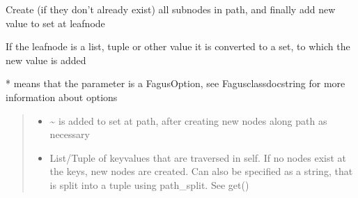 \documentclass[a4paper,10pt,english]{sphinxmanual}
\begin{document}
\begin{fulllineitems}
\begin{fulllineitems}
\label{\detokenize{fagus:fagus.Fagus.add}}
\pysigstartsignatures
{}
\pysigstopsignatures
\sphinxAtStartPar
Create (if they don’t already exist) all sub\sphinxhyphen{}nodes in path, and finally add new value to set at leaf\sphinxhyphen{}node

\sphinxAtStartPar
If the leaf\sphinxhyphen{}node is a list, tuple or other value it is converted to a set, to which the new value is added

\sphinxAtStartPar
* means that the parameter is a FagusOption, see Fagus\sphinxhyphen{}class\sphinxhyphen{}docstring for more information about options
\begin{quote}\begin{description}
\begin{itemize}
\item {}
\sphinxAtStartPar
{} \textendash{} \textasciitilde{} is added to set at path, after creating new nodes along path as necessary

\item {}
\sphinxAtStartPar
{} \textendash{} List/Tuple of key\sphinxhyphen{}values that are traversed in self. If no nodes exist at the keys, new nodes are
created. Can also be specified as a string, that is split into a tuple using path\_split. See get()


\end{itemize}
\end{description}
\end{quote}
\end{fulllineitems}
\end{fulllineitems}
\end{document}
